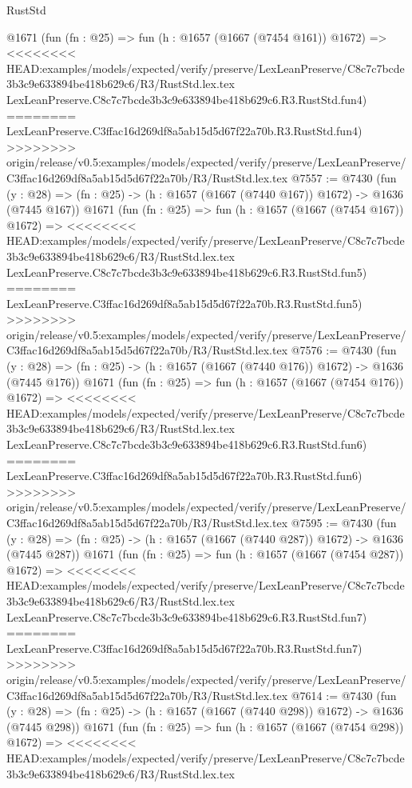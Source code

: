 \begin{lexlean}{RustStd}
\begin{coremodule}
{\begin{coremodule}
{{{{{{{{{{{{{{{{    @1671
    (fun (fn : @25) =>
    fun (h : @1657 (@1667 (@7454 @161)) @1672) =>
<<<<<<<< HEAD:examples/models/expected/verify/preserve/LexLeanPreserve/C8c7c7bcde3b3c9e633894be418b629c6/R3/RustStd.lex.tex
    LexLeanPreserve.C8c7c7bcde3b3c9e633894be418b629c6.R3.RustStd.fun4)
========
    LexLeanPreserve.C3ffac16d269df8a5ab15d5d67f22a70b.R3.RustStd.fun4)
>>>>>>>> origin/release/v0.5:examples/models/expected/verify/preserve/LexLeanPreserve/C3ffac16d269df8a5ab15d5d67f22a70b/R3/RustStd.lex.tex
@7557 := @7430
    (fun (y : @28) => (fn : @25) -> (h : @1657 (@1667 (@7440 @167)) @1672) -> @1636 (@7445 @167))
    @1671
    (fun (fn : @25) =>
    fun (h : @1657 (@1667 (@7454 @167)) @1672) =>
<<<<<<<< HEAD:examples/models/expected/verify/preserve/LexLeanPreserve/C8c7c7bcde3b3c9e633894be418b629c6/R3/RustStd.lex.tex
    LexLeanPreserve.C8c7c7bcde3b3c9e633894be418b629c6.R3.RustStd.fun5)
========
    LexLeanPreserve.C3ffac16d269df8a5ab15d5d67f22a70b.R3.RustStd.fun5)
>>>>>>>> origin/release/v0.5:examples/models/expected/verify/preserve/LexLeanPreserve/C3ffac16d269df8a5ab15d5d67f22a70b/R3/RustStd.lex.tex
@7576 := @7430
    (fun (y : @28) => (fn : @25) -> (h : @1657 (@1667 (@7440 @176)) @1672) -> @1636 (@7445 @176))
    @1671
    (fun (fn : @25) =>
    fun (h : @1657 (@1667 (@7454 @176)) @1672) =>
<<<<<<<< HEAD:examples/models/expected/verify/preserve/LexLeanPreserve/C8c7c7bcde3b3c9e633894be418b629c6/R3/RustStd.lex.tex
    LexLeanPreserve.C8c7c7bcde3b3c9e633894be418b629c6.R3.RustStd.fun6)
========
    LexLeanPreserve.C3ffac16d269df8a5ab15d5d67f22a70b.R3.RustStd.fun6)
>>>>>>>> origin/release/v0.5:examples/models/expected/verify/preserve/LexLeanPreserve/C3ffac16d269df8a5ab15d5d67f22a70b/R3/RustStd.lex.tex
@7595 := @7430
    (fun (y : @28) => (fn : @25) -> (h : @1657 (@1667 (@7440 @287)) @1672) -> @1636 (@7445 @287))
    @1671
    (fun (fn : @25) =>
    fun (h : @1657 (@1667 (@7454 @287)) @1672) =>
<<<<<<<< HEAD:examples/models/expected/verify/preserve/LexLeanPreserve/C8c7c7bcde3b3c9e633894be418b629c6/R3/RustStd.lex.tex
    LexLeanPreserve.C8c7c7bcde3b3c9e633894be418b629c6.R3.RustStd.fun7)
========
    LexLeanPreserve.C3ffac16d269df8a5ab15d5d67f22a70b.R3.RustStd.fun7)
>>>>>>>> origin/release/v0.5:examples/models/expected/verify/preserve/LexLeanPreserve/C3ffac16d269df8a5ab15d5d67f22a70b/R3/RustStd.lex.tex
@7614 := @7430
    (fun (y : @28) => (fn : @25) -> (h : @1657 (@1667 (@7440 @298)) @1672) -> @1636 (@7445 @298))
    @1671
    (fun (fn : @25) =>
    fun (h : @1657 (@1667 (@7454 @298)) @1672) =>
<<<<<<<< HEAD:examples/models/expected/verify/preserve/LexLeanPreserve/C8c7c7bcde3b3c9e633894be418b629c6/R3/RustStd.lex.tex
}}}}}}}}}}}}}}}}
\end{coremodule}}
\end{coremodule}
\end{lexlean}
